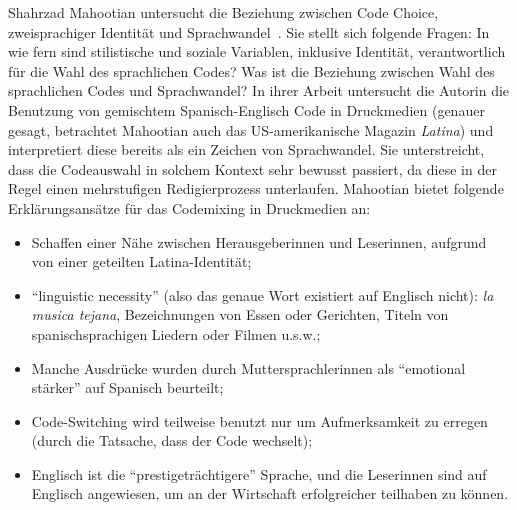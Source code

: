 Shahrzad Mahootian untersucht die Beziehung zwischen Code Choice, zweisprachiger Identität und Sprachwandel~\cite[]{Mahootian05}.
Sie stellt sich folgende Fragen: In wie fern sind stilistische und soziale Variablen, inklusive Identität, verantwortlich für die Wahl des sprachlichen Codes?
Was ist die Beziehung zwischen Wahl des sprachlichen Codes und Sprachwandel?
In ihrer Arbeit untersucht die Autorin die Benutzung von gemischtem Spanisch-Englisch Code in Druckmedien (genauer gesagt, betrachtet Mahootian auch das US-amerikanische Magazin \textit{Latina}) und interpretiert diese bereits als ein Zeichen von Sprachwandel.
Sie unterstreicht, dass die Codeauswahl in solchem Kontext sehr bewusst passiert, da diese in der Regel einen mehrstufigen Redigierprozess unterlaufen.
Mahootian bietet folgende Erklärungsansätze für das Codemixing in Druckmedien an:
\begin{itemize}
  \item Schaffen einer Nähe zwischen Herausgeberinnen und Leserinnen, aufgrund von einer geteilten Latina-Identität;
  \item ``linguistic necessity'' (also das genaue Wort existiert auf Englisch nicht): \textit{la musica tejana}, Bezeichnungen von Essen oder Gerichten, Titeln von spanischsprachigen Liedern oder Filmen u.s.w.;
  \item Manche Ausdrücke wurden durch Muttersprachlerinnen als ``emotional stärker'' auf Spanisch beurteilt;
  \item Code-Switching wird teilweise benutzt nur um Aufmerksamkeit zu erregen (durch die Tatsache, dass der Code wechselt);
  \item Englisch ist die ``prestigeträchtigere'' Sprache, und die Leserinnen sind auf Englisch angewiesen, um an der Wirtschaft erfolgreicher teilhaben zu können.
\end{itemize}



